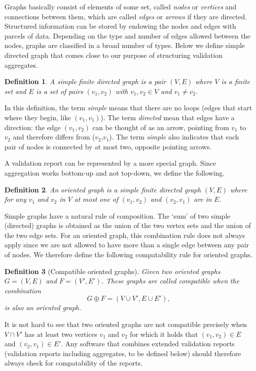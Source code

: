 \documentclass[a4paper, 11pt,titlepage]{article}
\newtheorem{definition}{Definition}
\begin{document}
Graphs basically consist of elements of some set, called \emph{nodes} or
\emph{vertices} and connections between them, which are called \emph{edges} or
\emph{arrows} if they are directed. Structured information can be stored by
endowing the nodes and edges with parcels of data.  Depending on the type and
number of edges allowed between the nodes, graphs are classified in a broad
number of types.  Below we define simple directed graph that comes close to our
purpose of structuring validation aggregates.
%
\begin{definition}
A \emph{simple finite directed graph} is a pair  $(V,E)$ where $V$ is a finite set and $E$
is a set of pairs $(v_1,v_2)$ with $v_1,v_2\in V$ and $v_1\not=v_2$.
\end{definition}
In this definition, the term \emph{simple} means that there are no loops (edges
that start where they begin, like $(v_1,v_1)$). The term \emph{directed} mean
that edges have a direction: the edge $(v_1,v_2)$ can be thought of as an
arrow, pointing from $v_1$ to $v_2$ and therefore differs from ($v_2$,$v_1$).
The term \emph{simple} also indicates that each pair of nodes is connected by
at most two, opposite pointing arrows.


A validation report can be represented by a more special graph. Since
aggregation works bottom-up and not top-down, we define the following.
\begin{definition}
An \emph{oriented graph} is a simple finite directed graph $(V,E)$ where for any
$v_1$ and $v_2$ in $V$ at most one of $(v_1,v_2)$ and $(v_2,v_1)$ are in $E$.
\end{definition}
%
Simple graphs have a natural rule of composition. The `sum' of two simple
(directed) graphs is obtained as the union of the two vertex sets and the union
of the two edge sets. For an oriented graph, this combination rule does not
always apply since we are not allowed to have more than a single edge between
any pair of nodes.  We therefore define the following compatability rule for
oriented graphs.
\begin{definition}[Compatible oriented graphs]
Given two oriented graphs $G=(V,E)$ and $F=(V',E')$. These graphs are called
\emph{compatible} when the combination
\begin{equation}
G\oplus F = (V\cup V', E\cup E'),
\end{equation}
is also an oriented graph.
\end{definition}
It is not hard to see that two oriented graphs are not compatible precisely
when $V\cap V'$ has at least two vertices $v_1$ and $v_2$ for which it holds
that $(v_1,v_2)\in E$ and $(v_2,v_1)\in E'$. Any software that combines
extended validation reports (validation reports including aggregates, to be
defined below) should therefore always check for compatability of the reports.
\end{document}
